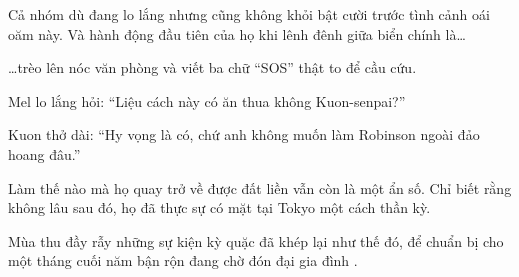 \documentclass[../main.tex]{subfiles}
\begin{document}
Cả nhóm dù đang lo lắng nhưng cũng không khỏi bật cười trước tình cảnh oái oăm này. Và hành động đầu tiên của họ khi lênh đênh giữa biển chính là\dots


\dots trèo lên nóc văn phòng và viết ba chữ ``SOS'' thật to để cầu cứu.

Mel lo lắng hỏi: ``Liệu cách này có ăn thua không Kuon-senpai?''

Kuon thở dài: ``Hy vọng là có, chứ anh không muốn làm Robinson ngoài đảo hoang đâu.''

Làm thế nào mà họ quay trở về được đất liền vẫn còn là một ẩn số. Chỉ biết rằng không lâu sau đó, họ đã thực sự có mặt tại Tokyo một cách thần kỳ.

Mùa thu đầy rẫy những sự kiện kỳ quặc đã khép lại như thế đó, để chuẩn bị cho một tháng cuối năm bận rộn đang chờ đón đại gia đình \hll.
\end{document}
